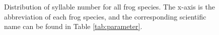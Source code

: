 \begin{figure}[htb!] %
\caption[Distribution of number of syllables for all frog species]{Distribution of syllable number for all frog species. The x-axis is the abbreviation of each frog species, and the corresponding scientific name can be found in Table \ref{tab:parameter}.}
\label{fig:Ch5_syllable} 
\end{figure}





